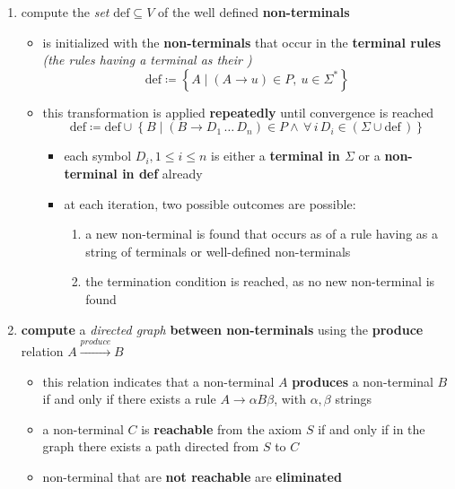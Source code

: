 \documentclass[english]{article}
\begin{document}
\begin{enumerate}[label=step \arabic*., ref=(step \arabic*), labelindent=1em, leftmargin=*, widest*=7]
  \item compute the \textit{set} \(\text{def} \subseteq V\) of the well defined \textbf{non-terminals}
        \begin{itemize}
          \item {} is initialized with the \textbf{non-terminals} that occur in the \textbf{terminal rules} \textit{(the rules having a terminal as their \RP)}
                \[ \text{def} \coloneqq \left\{ A \mid (A \rightarrow u) \in P, \ u \in \Sigma^\ast  \right\} \]
          \item this transformation is applied \textbf{repeatedly} until convergence is reached
                \[ \text{def} \coloneqq \text{def} \cup \left\{ B \mid (B \rightarrow D_1 \,\ldots\, D_n) \in P \land \, \forall \, i \, D_i \in \left(\Sigma \cup \text{def} \,\right)\right\} \]
                \begin{itemize}
                  \item each symbol \(D_i, 1 \leq i \leq n\) is either a \textbf{terminal in \(\Sigma\)} or a \textbf{non-terminal in def} already
                  \item at each iteration, two possible outcomes are possible:
                        \begin{enumerate}
                          \item a new non-terminal is found that occurs as \LP of a rule having as \RP a string of terminals or well-defined non-terminals
                          \item the termination condition is reached, as no new non-terminal is found
                        \end{enumerate}
                \end{itemize}
        \end{itemize}
  \item \textbf{compute} a \textit{directed graph} \textbf{between non-terminals} using the \textbf{produce} relation \(A \xrightarrow{produce} B\)
        \begin{itemize}
          \item this relation indicates that a non-terminal \(A\) \textbf{produces} a non-terminal \(B\) if and only if there exists a rule \(A \rightarrow \alpha B \beta\), with \(\alpha, \beta\) strings
          \item a non-terminal \(C\) is \textbf{reachable} from the axiom \(S\) if and only if in the graph there exists a path directed from \(S\) to \(C\)
          \item non-terminal that are \textbf{not reachable} are \textbf{eliminated}
        \end{itemize}
\end{enumerate}
\end{document}
